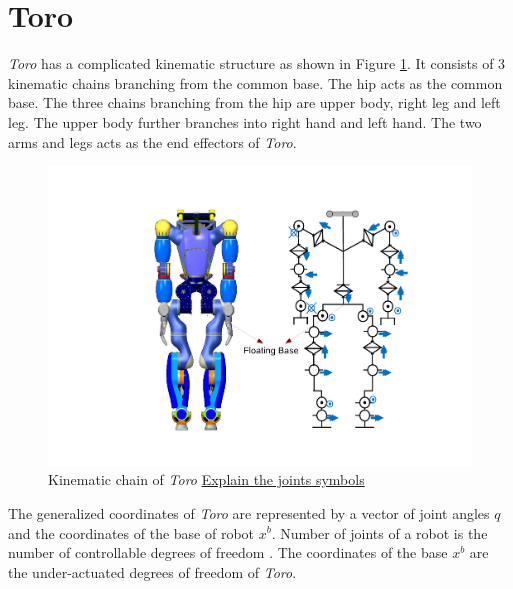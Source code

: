 \section{Toro}
\emph{Toro} has a complicated kinematic structure as shown in Figure \ref{fig:toro_kin}. It consists of 3 kinematic chains branching from the common base. The hip acts as the common base. The three chains branching from the hip are  upper body, right leg and left leg. The upper body further branches into right hand and left hand. The two arms and legs acts as the end effectors of \emph{Toro}.

\begin{figure}
\begin{center}
\includegraphics[trim= 70mm 10mm 40mm 10mm,clip,scale=0.7]{Bilder/TORO_kinematic.pdf}
\caption{Kinematic chain of \emph{Toro} \underline{Explain the joints symbols}}
\label{fig:toro_kin}
\end{center}
\end{figure}

The generalized coordinates of \emph{Toro} are represented by a vector of joint angles $q$ and the coordinates of the base of robot $x^b$. Number of joints of a robot is the number of controllable degrees of freedom \cite[Chapter 2]{mur94}. The coordinates of the base $x^b$ are the under-actuated degrees of freedom of \emph{Toro}. 

